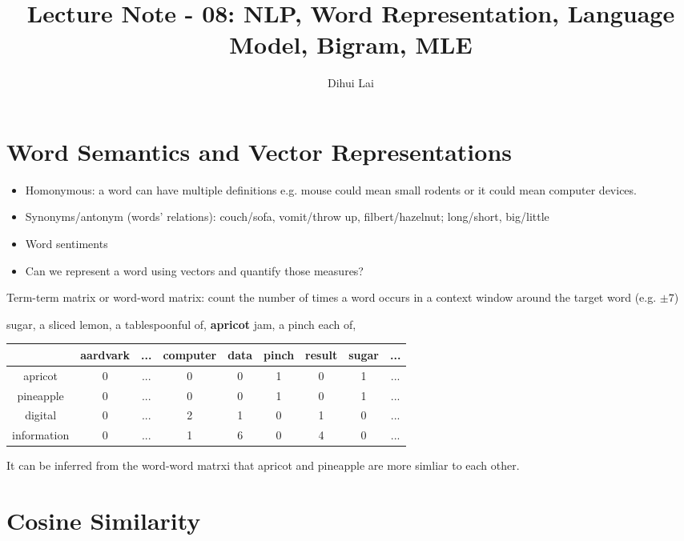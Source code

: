 \documentclass[12pt, oneside]{article}
\title{Lecture Note - 08: NLP, Word Representation, Language Model, Bigram, MLE}
\author{Dihui Lai}
\begin{document}
\maketitle
\tableofcontents

\vspace{.25in}


\section{Word Semantics and Vector Representations}
\begin{itemize} 
\item Homonymous: a word can have multiple definitions e.g. mouse could mean small rodents or it could mean computer devices. 
\item Synonyms/antonym (words' relations): couch/sofa, vomit/throw up, filbert/hazelnut; long/short, big/little
\item Word sentiments
\item Can we represent a word using vectors and quantify those measures?
\end{itemize}


Term-term matrix or word-word matrix: count the number of times a word occurs in a context window around the target word (e.g. $\pm 7$)

sugar, a sliced lemon, a tablespoonful of, {\bfseries apricot} jam, a pinch each of,

\begin{center}
 \begin{tabular}{c c c c c c c c c} 
 \hline
   & aardvark &...& computer & data & pinch & result & sugar & ...\\ [0.5ex] 
 \hline\hline
 apricot & 0 &...& 0 & 0 & 1 & 0 & 1 & ...\\ 
 \hline
 pineapple & 0 &...& 0 & 0 & 1 & 0 & 1 & ...\\
 \hline
 digital  & 0 &...& 2 & 1 & 0 & 1 & 0 & ...\\
 \hline
 information  & 0 &...& 1 & 6 & 0 & 4 & 0 & ... \\
 \hline
\end{tabular}
\end{center}

It can be inferred from the word-word matrxi that apricot and pineapple are more simliar to each other. 





\section{Cosine Similarity}
\end{document}
